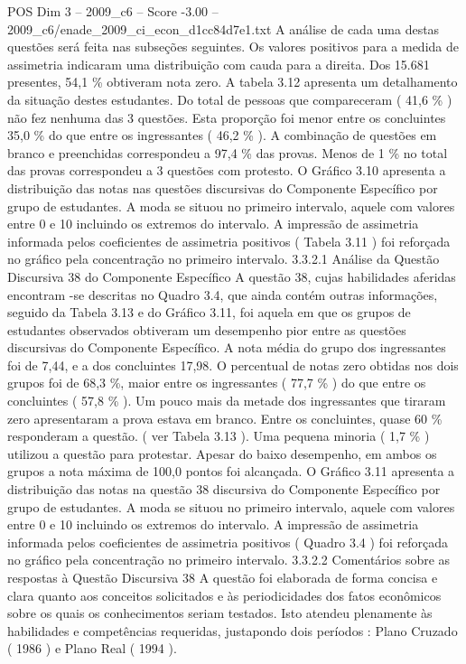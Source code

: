 \begin{textsample}{POS Dim 3 – 2009\_c6 – Score -3.00 – 2009\_c6/enade\_2009\_ci\_econ\_d1cc84d7e1.txt}
A análise de cada uma destas questões será feita nas subseções seguintes.
Os valores positivos para a medida de assimetria indicaram uma distribuição com cauda para a direita.
Dos 15.681 presentes, 54,1 \% obtiveram nota zero.
A tabela 3.12 apresenta um detalhamento da situação destes estudantes.
Do total de pessoas que compareceram ( 41,6 \% ) não fez nenhuma das 3 questões.
Esta proporção foi menor entre os concluintes 35,0 \% do que entre os ingressantes ( 46,2 \% ).
A combinação de questões em branco e preenchidas correspondeu a 97,4 \% das provas.
Menos de 1 \% no total das provas correspondeu a 3 questões com protesto.
O Gráfico 3.10 apresenta a distribuição das notas nas questões discursivas do Componente Específico por grupo de estudantes.
A moda se situou no primeiro intervalo, aquele com valores entre 0 e 10 incluindo os extremos do intervalo.
A impressão de assimetria informada pelos coeficientes de assimetria positivos ( Tabela 3.11 ) foi reforçada no gráfico pela concentração no primeiro intervalo. 3.3.2.1 Análise da Questão Discursiva 38 do Componente Específico A questão 38, cujas habilidades aferidas encontram -se descritas no Quadro 3.4, que ainda contém outras informações, seguido da Tabela 3.13 e do Gráfico 3.11, foi aquela em que os grupos de estudantes observados obtiveram um desempenho pior entre as questões discursivas do Componente Específico.
A nota média do grupo dos ingressantes foi de 7,44, e a dos concluintes 17,98.
O percentual de notas zero obtidas nos dois grupos foi de 68,3 \%, maior entre os ingressantes ( 77,7 \% ) do que entre os concluintes ( 57,8 \% ).
Um pouco mais da metade dos ingressantes que tiraram zero apresentaram a prova estava em branco.
Entre os concluintes, quase 60 \% responderam a questão. ( ver Tabela 3.13 ).
Uma pequena minoria ( 1,7 \% ) utilizou a questão para protestar.
Apesar do baixo desempenho, em ambos os grupos a nota máxima de 100,0 pontos foi alcançada.
O Gráfico 3.11 apresenta a distribuição das notas na questão 38 discursiva do Componente Específico por grupo de estudantes.
A moda se situou no primeiro intervalo, aquele com valores entre 0 e 10 incluindo os extremos do intervalo.
A impressão de assimetria informada pelos coeficientes de assimetria positivos ( Quadro 3.4 ) foi reforçada no gráfico pela concentração no primeiro intervalo. 3.3.2.2 Comentários sobre as respostas à Questão Discursiva 38 A questão foi elaborada de forma concisa e clara quanto aos conceitos solicitados e às periodicidades dos fatos econômicos sobre os quais os conhecimentos seriam testados.
Isto atendeu plenamente às habilidades e competências requeridas, justapondo dois períodos : Plano Cruzado ( 1986 ) e Plano Real ( 1994 ).

\end{textsample}
